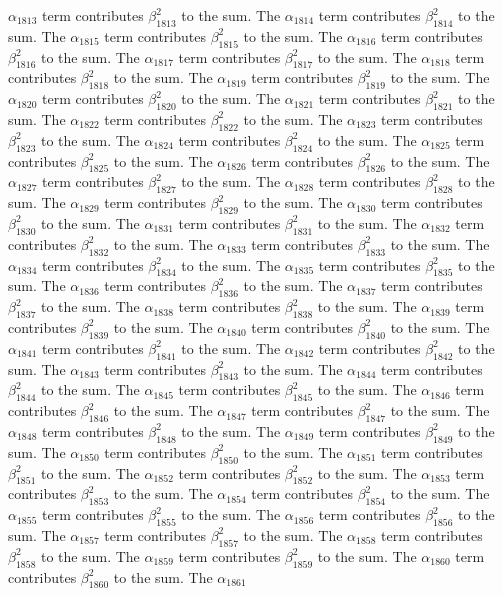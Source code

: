 \begin{lemma}
$\alpha_{1813}$ term contributes $\beta_{1813}^{2}$ to the sum. The $\alpha_{1814}$ term contributes $\beta_{1814}^{2}$ to the sum. The $\alpha_{1815}$ term contributes $\beta_{1815}^{2}$ to the sum. The $\alpha_{1816}$ term contributes $\beta_{1816}^{2}$ to the sum. The $\alpha_{1817}$ term contributes $\beta_{1817}^{2}$ to the sum. The $\alpha_{1818}$ term contributes $\beta_{1818}^{2}$ to the sum. The $\alpha_{1819}$ term contributes $\beta_{1819}^{2}$ to the sum. The $\alpha_{1820}$ term contributes $\beta_{1820}^{2}$ to the sum. The $\alpha_{1821}$ term contributes $\beta_{1821}^{2}$ to the sum. The $\alpha_{1822}$ term contributes $\beta_{1822}^{2}$ to the sum. The $\alpha_{1823}$ term contributes $\beta_{1823}^{2}$ to the sum. The $\alpha_{1824}$ term contributes $\beta_{1824}^{2}$ to the sum. The $\alpha_{1825}$ term contributes $\beta_{1825}^{2}$ to the sum. The $\alpha_{1826}$ term contributes $\beta_{1826}^{2}$ to the sum. The $\alpha_{1827}$ term contributes $\beta_{1827}^{2}$ to the sum. The $\alpha_{1828}$ term contributes $\beta_{1828}^{2}$ to the sum. The $\alpha_{1829}$ term contributes $\beta_{1829}^{2}$ to the sum. The $\alpha_{1830}$ term contributes $\beta_{1830}^{2}$ to the sum. The $\alpha_{1831}$ term contributes $\beta_{1831}^{2}$ to the sum. The $\alpha_{1832}$ term contributes $\beta_{1832}^{2}$ to the sum. The $\alpha_{1833}$ term contributes $\beta_{1833}^{2}$ to the sum. The $\alpha_{1834}$ term contributes $\beta_{1834}^{2}$ to the sum. The $\alpha_{1835}$ term contributes $\beta_{1835}^{2}$ to the sum. The $\alpha_{1836}$ term contributes $\beta_{1836}^{2}$ to the sum. The $\alpha_{1837}$ term contributes $\beta_{1837}^{2}$ to the sum. The $\alpha_{1838}$ term contributes $\beta_{1838}^{2}$ to the sum. The $\alpha_{1839}$ term contributes $\beta_{1839}^{2}$ to the sum. The $\alpha_{1840}$ term contributes $\beta_{1840}^{2}$ to the sum. The $\alpha_{1841}$ term contributes $\beta_{1841}^{2}$ to the sum. The $\alpha_{1842}$ term contributes $\beta_{1842}^{2}$ to the sum. The $\alpha_{1843}$ term contributes $\beta_{1843}^{2}$ to the sum. The $\alpha_{1844}$ term contributes $\beta_{1844}^{2}$ to the sum. The $\alpha_{1845}$ term contributes $\beta_{1845}^{2}$ to the sum. The $\alpha_{1846}$ term contributes $\beta_{1846}^{2}$ to the sum. The $\alpha_{1847}$ term contributes $\beta_{1847}^{2}$ to the sum. The $\alpha_{1848}$ term contributes $\beta_{1848}^{2}$ to the sum. The $\alpha_{1849}$ term contributes $\beta_{1849}^{2}$ to the sum. The $\alpha_{1850}$ term contributes $\beta_{1850}^{2}$ to the sum. The $\alpha_{1851}$ term contributes $\beta_{1851}^{2}$ to the sum. The $\alpha_{1852}$ term contributes $\beta_{1852}^{2}$ to the sum. The $\alpha_{1853}$ term contributes $\beta_{1853}^{2}$ to the sum. The $\alpha_{1854}$ term contributes $\beta_{1854}^{2}$ to the sum. The $\alpha_{1855}$ term contributes $\beta_{1855}^{2}$ to the sum. The $\alpha_{1856}$ term contributes $\beta_{1856}^{2}$ to the sum. The $\alpha_{1857}$ term contributes $\beta_{1857}^{2}$ to the sum. The $\alpha_{1858}$ term contributes $\beta_{1858}^{2}$ to the sum. The $\alpha_{1859}$ term contributes $\beta_{1859}^{2}$ to the sum. The $\alpha_{1860}$ term contributes $\beta_{1860}^{2}$ to the sum. The $\alpha_{1861}$ 
\end{lemma}
